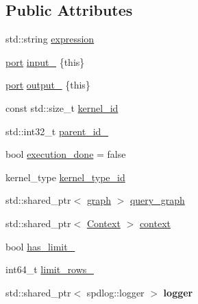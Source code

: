 \subsection*{Public Attributes}
\begin{DoxyCompactItemize}
\item 
std\+::string \hyperlink{classral_1_1cache_1_1kernel_a0619a9c1e4952dc353dcfa079910a84a}{expression}
\item 
\hyperlink{classral_1_1cache_1_1port}{port} \hyperlink{classral_1_1cache_1_1kernel_a014bae9051f8ae95341be2f967b135c5}{input\+\_\+} \{this\}
\item 
\hyperlink{classral_1_1cache_1_1port}{port} \hyperlink{classral_1_1cache_1_1kernel_a6eac1b9f1e6efb3bb9942ba7bbf66a94}{output\+\_\+} \{this\}
\item 
const std\+::size\+\_\+t \hyperlink{classral_1_1cache_1_1kernel_a2fd708656cb056a41ec635b8bdc4acfe}{kernel\+\_\+id}
\item 
std\+::int32\+\_\+t \hyperlink{classral_1_1cache_1_1kernel_ad1b8b87c5008b3bce16fe45da84eccdd}{parent\+\_\+id\+\_\+}
\item 
bool \hyperlink{classral_1_1cache_1_1kernel_a8ac24c565e0d29b390d40e7ef3366486}{execution\+\_\+done} = false
\item 
kernel\+\_\+type \hyperlink{classral_1_1cache_1_1kernel_a923841bcb8d995048c58d51a6c39caf7}{kernel\+\_\+type\+\_\+id}
\item 
std\+::shared\+\_\+ptr$<$ \hyperlink{classral_1_1cache_1_1graph}{graph} $>$ \hyperlink{classral_1_1cache_1_1kernel_a5fbb02292aff165a28ef25e75f0d89bd}{query\+\_\+graph}
\item 
std\+::shared\+\_\+ptr$<$ \hyperlink{classblazingdb_1_1manager_1_1Context}{Context} $>$ \hyperlink{classral_1_1cache_1_1kernel_af0347d14d678cfa7205c1387746a2e1b}{context}
\item 
bool \hyperlink{classral_1_1cache_1_1kernel_a913add84b5ad4c0bb09f7a609fe8e311}{has\+\_\+limit\+\_\+}
\item 
int64\+\_\+t \hyperlink{classral_1_1cache_1_1kernel_a415a4613c3eac81c1f65340e0866d26e}{limit\+\_\+rows\+\_\+}
\item 
\mbox{\label{classral_1_1cache_1_1kernel_ae891570bebe342865bc0f30ac369efe8}} 
std\+::shared\+\_\+ptr$<$ spdlog\+::logger $>$ {\bfseries logger}
\end{DoxyCompactItemize}

